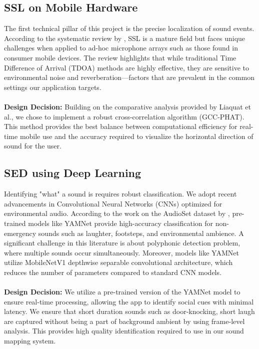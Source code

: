\subsection{SSL on Mobile Hardware}
\label{subsec:ssl}
The first technical pillar of this project is the precise localization of sound events. 
According to the systematic review by \cite{Liaquat2021}, SSL is a mature field but faces unique challenges when applied to ad-hoc microphone arrays such as those found in consumer mobile devices. 
The review highlights that while traditional Time Difference of Arrival (TDOA) methods are highly effective, they are sensitive to environmental noise and reverberation—factors that are prevalent in the common settings our application targets.
\\
\\
\textbf{Design Decision:} Building on the comparative analysis provided by Liaquat et al., we chose to implement a robust cross-correlation algorithm (GCC-PHAT). 
This method provides the best balance between computational efficiency for real-time mobile use and the accuracy required to visualize the horizontal direction of sound for the user.

\subsection{SED using Deep Learning}
\label{subsec:sed}
Identifying "what" a sound is requires robust classification. 
We adopt recent advancements in Convolutional Neural Networks (CNNs) optimized for environmental audio. 
According to the work on the AudioSet dataset by \cite{gemmeke2017audio}, pre-trained models like YAMNet provide high-accuracy classification for non-emergency sounds such as laughter, footsteps, and environmental ambience.
A significant challenge in this literature is about polyphonic detection problem, where multiple sounds occur simultaneously.
Moreover, models like YAMNet utilize MobileNetV1 depthwise separable convolutional architecture, which reduces the number of parameters compared to standard CNN models.
\\
\\
\textbf{Design Decision:} We utilize a pre-trained version of the YAMNet model to ensure real-time processing, allowing the app to identify social cues with minimal latency.
We ensure that short duration sounds such as door-knocking, short laugh are captured without being a part of background ambient by using frame-level analysis.
This provides high quality identification required to use in our sound mapping system.

